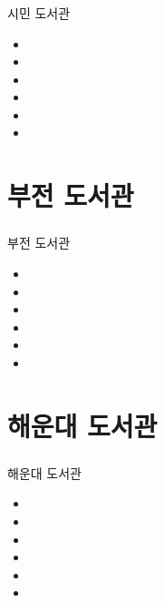\documentclass[aspectratio=1610,17pt,xcolor=pdftex,dvipsnames,table,handout]{beamer}
\begin{document}
		\begin{frame} [t,plain]
		\frametitle{}

			\begin{block} {시민 도서관}
			\setlength{\leftmargini}{2em}			
			\begin{itemize}
				\item 
				\item 
				\item 
				\item 
				\item 
				\item 
			\end{itemize}
			\end{block}						
		\end{frame}						

		\section 	{부전 도서관}

		\begin{frame} [t,plain]
		\frametitle{}

			\begin{block} {부전 도서관}
			\setlength{\leftmargini}{2em}			
			\begin{itemize}
				\item 
				\item 
				\item 
				\item 
				\item 
				\item 
			\end{itemize}
			\end{block}						
		\end{frame}						


		\section 	{해운대 도서관}

		\begin{frame} [t,plain]
		\frametitle{}

			\begin{block} {해운대 도서관}
			\setlength{\leftmargini}{2em}			
			\begin{itemize}
				\item 
				\item 
				\item 
				\item 
				\item 
				\item 
			\end{itemize}
			\end{block}						
		\end{frame}						
\end{document}

